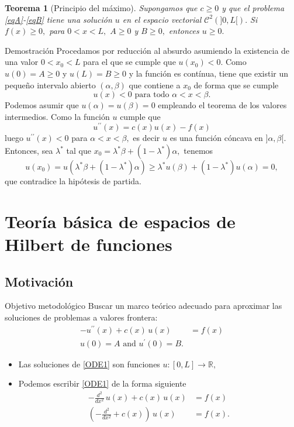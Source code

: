 \documentclass[10pt,handout]{beamer}
\theoremstyle{plain} %
\newtheorem{thm}{Teorema}
\theoremstyle{plain} %
\theoremstyle{plain} %
\theoremstyle{plain} %
\theoremstyle{definition}
\theoremstyle{example}
\theoremstyle{example}
\theoremstyle{remark}
\theoremstyle{remark}
\begin{document}
\begin{frame}
\begin{thm}[Principio del máximo]
Supongamos que $c \ge 0$ y que el problema \eqref{eqA}-\eqref{eqB} tiene una solución  $u$ en el espacio vectorial $\mathcal{C}^2(]0,L[).$ Si $f(x) \ge 0,$ para $0 < x < L,$ $A \ge 0$ y $B \ge 0,$ entonces $u \ge 0.$
\end{thm}
\end{frame}

\begin{frame}{Demostración}
Procedamos por reducción al absurdo asumiendo la existencia de una valor $0 < x_0 < L$ para el
que se cumple que $u(x_0) < 0.$ Como $u(0) = A \ge 0$ y $u(L)=B \ge 0$ y la función es contínua, tiene que existir un pequeño intervalo abierto $(\alpha,\beta)$ que contiene a $x_0$ de forma que se cumple
$$
u(x) < 0 \text{ para todo } \alpha < x < \beta.
$$
Podemos asumir que $u(\alpha)=u(\beta) = 0$ empleando el teorema de los valores intermedios. Como
la función $u$ cumple que
$$
u^{\prime \prime}(x) = c(x)u(x) - f(x)
$$
luego $u^{\prime \prime}(x) < 0$ para $\alpha < x < \beta,$ es decir $u$ es una función cóncava en 
$]\alpha,\beta[.$ Entonces, sea $\lambda^*$ tal que $x_0 = \lambda^*\beta + (1-\lambda^*)\alpha,$
tenemos
$$
u(x_0) = u(\lambda^*\beta + (1-\lambda^*)\alpha) \ge \lambda^*u(\beta) + (1-\lambda^*)u(\alpha) = 0,
$$
que contradice la hipótesis de partida.
\end{frame}

\section{Teoría básica de espacios de Hilbert de funciones}

\subsection{Motivación}
\begin{frame}
\begin{block}{Objetivo metodológico}
Buscar un marco teórico adecuado para aproximar las soluciones de problemas a valores frontera:
\begin{align}
- u^{\prime \prime}(x) + c(x)\,u(x) & = f(x) \label{ODE1} \\ 
 u(0) = A  \text{ and } u^{\prime}(0) = B.  \label{ODE2}
\end{align}
\begin{itemize}
\item Las soluciones de \eqref{ODE1} son funciones $u:[0,L] \longrightarrow \mathbb{R},$
\item Podemos escribir \eqref{ODE1} de la forma siguiente
\begin{align}
-\frac{d^2}{dx^2} \, u(x) + c(x) \, u(x) & =  f(x)  \label{ODE1a} \\
\left(-\frac{d^2}{dx^2} + c(x) \right)\, u(x) & =  f(x).  \label{ODE1b}
\end{align}
\end{itemize}
\end{block}
\end{frame}
\end{document}
